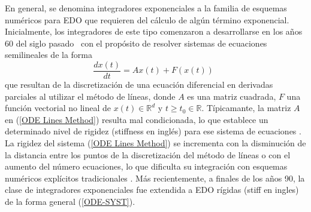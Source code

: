 En general, se denomina integradores exponenciales a la familia
de esquemas numéricos para EDO que requieren del cálculo de algún término exponencial. Inicialmente, los integradores de este tipo comenzaron a desarrollarse en los años 60 del siglo pasado~\cite{Berland07} con el propósito de resolver sistemas de ecuaciones semilineales de la forma
\begin{equation}
\frac{dx(t)}{dt} = Ax(t) + F(x(t))  \;\;  \label{ODE Lines Method}
\end{equation}
que resultan de la discretización de una ecuación diferencial en derivadas parciales al utilizar el método de líneas, donde $A$ es una
matriz cuadrada, $F$ una función vectorial no lineal de $x(t)\in\mathbb{R}^d$ y $t\geq t_0 \in \mathbb{R}$. Típicamante, la matriz $A$ en (\ref{ODE Lines Method}) resulta mal condicionada, lo que establece un determinado nivel de rigidez (stiffness en inglés) para ese sistema de ecuaciones \cite{schiesser2012}. La rigidez del sistema (\ref{ODE Lines Method}) se incrementa con la disminución de la distancia entre los puntos de la discretización del método de líneas o con el aumento del número ecuaciones, lo que dificulta su integración con esquemas numéricos explícitos tradicionales \cite{schiesser2012}. Más recientemente, a finales de los años 90, la clase de integradores exponenciales fue extendida a EDO rígidas (stiff en ingles) de la forma general (\ref{ODE-SYST}).

